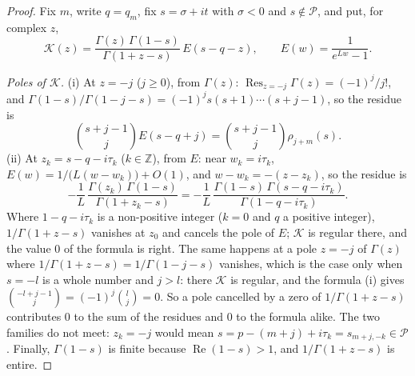 \documentclass[11pt]{article}
\newcommand{\re}{\operatorname{Re}}
\newcommand{\Res}{\operatorname{Res}}
\begin{document}
\begin{proof}
Fix $m$, write $q=q_m$, fix $s=\sigma+it$ with $\sigma<0$ and $s\notin\mathcal{P}$, and put, for complex $z$,
\[
\mathcal{K}(z)=\frac{\Gamma(z)\,\Gamma(1-s)}{\Gamma(1+z-s)}\,E(s-q-z),\qquad E(w)=\frac{1}{e^{Lw}-1}.
\]

\emph{Poles of $\mathcal{K}$.} (i) At $z=-j$ ($j\ge0$), from $\Gamma(z)$: $\Res_{z=-j}\Gamma(z)=(-1)^j/j!$, and $\Gamma(1-s)/\Gamma(1-j-s)=(-1)^js(s+1)\cdots(s+j-1)$, so the residue is
\[
\binom{s+j-1}{j}E(s-q+j)=\binom{s+j-1}{j}\rho_{j+m}(s).
\]
(ii) At $z_k=s-q-i\tau_k$ ($k\in\mathbb{Z}$), from $E$: near $w_k=i\tau_k$, $E(w)=1/\bigl(L(w-w_k)\bigr)+O(1)$, and $w-w_k=-(z-z_k)$, so the residue is
\[
-\frac1L\,\frac{\Gamma(z_k)\,\Gamma(1-s)}{\Gamma(1+z_k-s)}=-\frac1L\,\frac{\Gamma(1-s)\,\Gamma(s-q-i\tau_k)}{\Gamma(1-q-i\tau_k)}.
\]
Where $1-q-i\tau_k$ is a non-positive integer ($k=0$ and $q$ a positive integer), $1/\Gamma(1+z-s)$ vanishes at $z_0$ and cancels the pole of $E$; $\mathcal{K}$ is regular there, and the value $0$ of the formula is right. The same happens at a pole $z=-j$ of $\Gamma(z)$ where $1/\Gamma(1+z-s)=1/\Gamma(1-j-s)$ vanishes, which is the case only when $s=-l$ is a whole number and $j>l$: there $\mathcal{K}$ is regular, and the formula (i) gives $\binom{-l+j-1}{j}=(-1)^j\binom{l}{j}=0$. So a pole cancelled by a zero of $1/\Gamma(1+z-s)$ contributes $0$ to the sum of the residues and $0$ to the formula alike. The two families do not meet: $z_k=-j$ would mean $s=p-(m+j)+i\tau_k=s_{m+j,-k}\in\mathcal{P}$. Finally, $\Gamma(1-s)$ is finite because $\re(1-s)>1$, and $1/\Gamma(1+z-s)$ is entire.


\end{proof}
\end{document}
